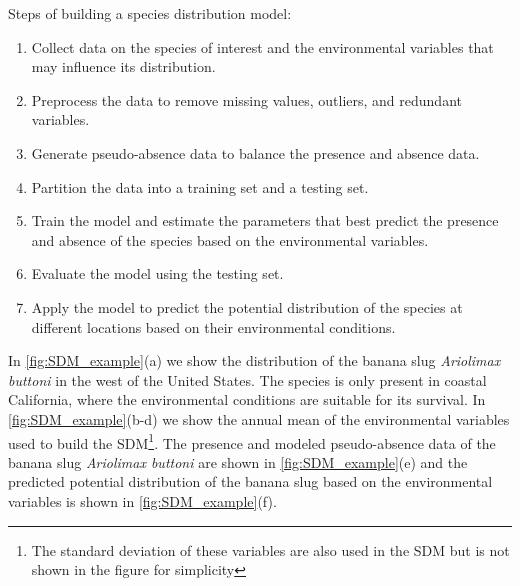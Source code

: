 \begin{theorem}
  Steps of building a species distribution model:
  \begin{enumerate}
    \item Collect data on the species of interest and the environmental
          variables that may influence its distribution.
    \item Preprocess the data to remove missing values, outliers, and
          redundant
          variables.
    \item Generate pseudo-absence data to balance the presence and absence
          data.
    \item Partition the data into a training set and a testing set.
    \item Train the model and estimate the parameters that best predict the
          presence and absence of the species based on the environmental
          variables.
    \item Evaluate the model using the testing set.
    \item Apply the model to predict the potential distribution of the
          species
          at different locations based on their environmental conditions.
  \end{enumerate}
\end{theorem}

In \cref{fig:SDM_example}(a) we show the distribution of the banana slug
\textit{Ariolimax buttoni} in the west of the United States. The species is
only present in coastal California, where the environmental conditions are
suitable for its survival. In \cref{fig:SDM_example}(b-d) we show the annual
mean of the environmental variables used to build the SDM\footnote{The
  standard deviation of these variables are also used in the SDM but is not
  shown in the figure for simplicity}. The presence and modeled pseudo-absence
data of the banana slug \textit{Ariolimax buttoni} are shown in
\cref{fig:SDM_example}(e) and the predicted potential distribution of the
banana slug based on the environmental variables is shown in
\cref{fig:SDM_example}(f).


